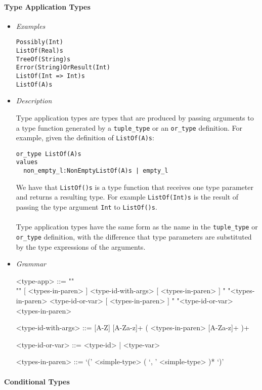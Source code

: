 \documentclass{article}
\begin{document}
\paragraph{Type Application Types}

\begin{itemize}
\item \textit{Examples}
\begin{verbatim}
Possibly(Int)
ListOf(Real)s
TreeOf(String)s 
Error(String)OrResult(Int)
ListOf(Int => Int)s
ListOf(A)s
\end{verbatim}

\item \textit{Description}

Type application types are types that are produced by passing arguments
to a type function generated by a \texttt{tuple_type} or an \texttt{or_type}
definition. For example, given the definition of \texttt{ListOf(A)s}:
\begin{verbatim}
or_type ListOf(A)s
values
  non_empty_l:NonEmptyListOf(A)s | empty_l
\end{verbatim}
We have that \texttt{ListOf()s} is a type function that receives one type parameter
and returns a resulting type. For example \texttt{ListOf(Int)s} is the result
of passing the type argument \texttt{Int} to \texttt{ListOf()s}.
\\\\
Type application types have the same form as the name in the
\texttt{tuple_type} or \texttt{or_type} definition, with the difference that
type parameters are substituted by the type expressions of the arguments.

\item \textit{Grammar}
\begin{grammar}
<type-app> ::= ""\\""
[ <types-in-paren> ] <type-id-with-args> [ <types-in-paren> ]
\alt " "<types-in-paren> <type-id-or-var> [ <types-in-paren> ]
\alt " "<type-id-or-var> <types-in-paren>

<type-id-with-args> ::= [A-Z] [A-Za-z]+ ( <types-in-paren> [A-Za-z]+ )+

<type-id-or-var> ::= <type-id> | <type-var>

<types-in-paren> ::= `(' <simple-type> ( `, ' <simple-type> )* `)'
\end{grammar}
\end{itemize}

\paragraph{Conditional Types}
\end{document}
